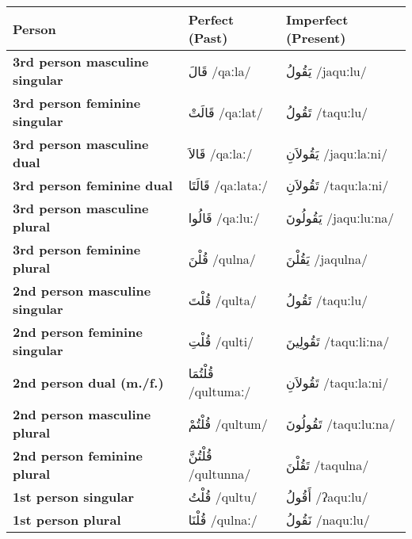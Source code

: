 \documentclass[letterpaper,12pt]{article}
\begin{document}
\begin{longtable}{|>{\raggedright}p{3.5cm}|p{5cm}|p{5cm}|}
\hline
\textbf{Person} & \textbf{Perfect (Past)} & \textbf{Imperfect (Present)} \\
\hline
\textbf{3rd person masculine singular} & \textarabic{قَالَ} /qaːla/ & \textarabic{يَقُولُ} /jaquːlu/ \\
\hline
\textbf{3rd person feminine singular} & \textarabic{قَالَتْ} /qaːlat/ & \textarabic{تَقُولُ} /taquːlu/ \\
\hline
\textbf{3rd person masculine dual} & \textarabic{قَالاَ} /qaːlaː/ & \textarabic{يَقُولاَنِ} /jaquːlaːni/ \\
\hline
\textbf{3rd person feminine dual} & \textarabic{قَالَتَا} /qaːlataː/ & \textarabic{تَقُولاَنِ} /taquːlaːni/ \\
\hline
\textbf{3rd person masculine plural} & \textarabic{قَالُوا} /qaːluː/ & \textarabic{يَقُولُونَ} /jaquːluːna/ \\
\hline
\textbf{3rd person feminine plural} & \textarabic{قُلْنَ} /qulna/ & \textarabic{يَقُلْنَ} /jaqulna/ \\
\hline
\textbf{2nd person masculine singular} & \textarabic{قُلْتَ} /qulta/ & \textarabic{تَقُولُ} /taquːlu/ \\
\hline
\textbf{2nd person feminine singular} & \textarabic{قُلْتِ} /qulti/ & \textarabic{تَقُولِينَ} /taquːliːna/ \\
\hline
\textbf{2nd person dual (m./f.)} & \textarabic{قُلْتُمَا} /qultumaː/ & \textarabic{تَقُولاَنِ} /taquːlaːni/ \\
\hline
\textbf{2nd person masculine plural} & \textarabic{قُلْتُمْ} /qultum/ & \textarabic{تَقُولُونَ} /taquːluːna/ \\
\hline
\textbf{2nd person feminine plural} & \textarabic{قُلْتُنَّ} /qultunna/ & \textarabic{تَقُلْنَ} /taqulna/ \\
\hline
\textbf{1st person singular} & \textarabic{قُلْتُ} /qultu/ & \textarabic{أَقُولُ} /ʔaquːlu/ \\
\hline
\textbf{1st person plural} & \textarabic{قُلْنَا} /qulnaː/ & \textarabic{نَقُولُ} /naquːlu/ \\
\hline
\end{longtable}
\end{document}
